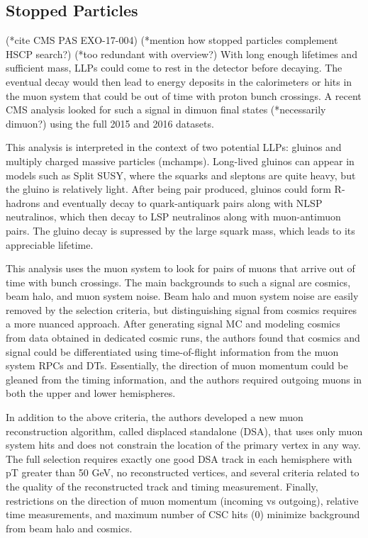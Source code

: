 \documentclass[12pt]{article}
\begin{document}
\subsection{Stopped Particles}
    (*cite CMS PAS EXO-17-004)
    (*mention how stopped particles complement HSCP search?)
    (*too redundant with overview?)
    With long enough lifetimes and sufficient mass, LLPs could come to rest in the detector before decaying. The eventual decay would then lead to energy deposits in the calorimeters or hits in the muon system that could be out of time with proton bunch crossings. A recent CMS analysis looked for such a signal in dimuon final states (*necessarily dimuon?) using the full 2015 and 2016 datasets. 

    This analysis is interpreted in the context of two potential LLPs: gluinos and multiply charged massive particles (mchamps). Long-lived gluinos can appear in models such as Split SUSY, where the squarks and sleptons are quite heavy, but the gluino is relatively light. After being pair produced, gluinos could form R-hadrons and eventually decay to quark-antiquark pairs along with NLSP neutralinos, which then decay to LSP neutralinos along with muon-antimuon pairs. The gluino decay is supressed by the large squark mass, which leads to its appreciable lifetime.

    This analysis uses the muon system to look for pairs of muons that arrive out of time with bunch crossings. The main backgrounds to such a signal are cosmics, beam halo, and muon system noise. Beam halo and muon system noise are easily removed by the selection criteria, but distinguishing signal from cosmics requires a more nuanced approach. After generating signal MC and modeling cosmics from data obtained in dedicated cosmic runs, the authors found that cosmics and signal could be differentiated using time-of-flight information from the muon system RPCs and DTs. Essentially, the direction of muon momentum could be gleaned from the timing information, and the authors required outgoing muons in both the upper and lower hemispheres.
    
    In addition to the above criteria, the authors developed a new muon reconstruction algorithm, called displaced standalone (DSA), that uses only muon system hits and does not constrain the location of the primary vertex in any way. The full selection requires exactly one good DSA track in each hemisphere with pT greater than 50 GeV, no reconstructed vertices, and several criteria related to the quality of the reconstructed track and timing measurement. Finally, restrictions on the direction of muon momentum (incoming vs outgoing), relative time measurements, and maximum number of CSC hits (0) minimize background from beam halo and cosmics.
\end{document}
